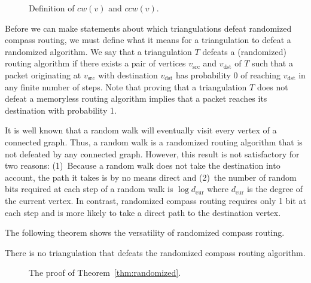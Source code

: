 \documentclass[final]{siamltex}
\newcommand{\centeripe}[1]{\begin{center}\Ipe{#1}\end{center}}
\newcommand{\figlabel}[1]{\label{fig:#1}}
\newcommand{\thmlabel}[1]{\label{thm:#1}}
\newcommand{\thmref}[1]{Theorem~\ref{thm:#1}}
\newcommand{\vsrc}{v_\mathrm{src}}
\newcommand{\vdest}{v_\mathrm{dst}}
\newcommand{\cwcompass}[1]{\mathit{cw}(#1)}
\newcommand{\ccwcompass}[1]{\mathit{ccw}(#1)}
\begin{document}
\begin{figure}
\centeripe{cw-ccw}
\caption{Definition of $\cwcompass{v}$ and $\ccwcompass{v}$.}
\figlabel{cw-ccw}
\end{figure}


Before we can make statements about which triangulations defeat
randomized compass routing, we must define what it means for a
triangulation to defeat a randomized algorithm.  We say that a
triangulation $T$ defeats a (randomized) routing algorithm if there
exists a pair of vertices $\vsrc$ and $\vdest$ of $T$ such that a
packet originating at $\vsrc$ with destination $\vdest$ has
probability 0 of reaching $\vdest$ in any finite number of steps.
Note that proving that a triangulation $T$ does not defeat a
memoryless routing algorithm implies that a packet reaches its
destination with probability 1.  

It is well known that a random walk will eventually visit every vertex
of a connected graph.  Thus, a random walk is a randomized routing
algorithm that is not defeated by any connected graph.  However, this
result is not satisfactory for two reasons: (1)~Because a random walk
does not take the destination into account, the path it takes is by no means
direct and (2)~the number of random bits required at each step of a random
walk is $\log d_\mathrm{cur}$ where $d_\mathrm{cur}$ is the degree of
the current vertex.  In contrast, randomized compass routing requires
only 1 bit at each step and is more likely to take a direct path to
the destination vertex.

The following theorem shows the versatility of randomized compass
routing.

\begin{theorem}\thmlabel{randomized}
There is no triangulation that defeats the randomized compass routing
algorithm.
\end{theorem}

\begin{figure}
\centeripe{random-compass-proof}
\caption{The proof of \thmref{randomized}.}
\figlabel{random-compass-proof}
\end{figure}
\end{document}
